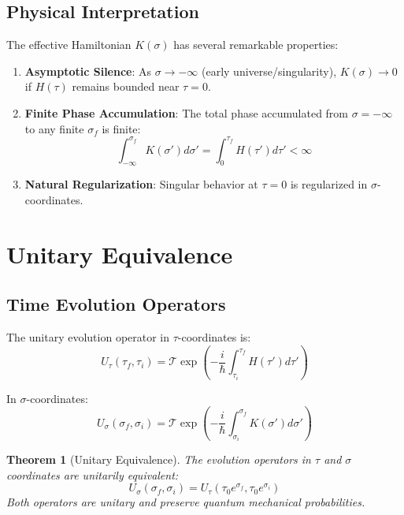 \documentclass[11pt,a4paper]{article}
\newtheorem{theorem}{Theorem}[section]
\begin{document}
\subsection{Physical Interpretation}

The effective Hamiltonian $K(\sigma)$ has several remarkable properties:

\begin{enumerate}
\item \textbf{Asymptotic Silence}: As $\sigma \to -\infty$ (early universe/singularity), $K(\sigma) \to 0$ if $H(\tau)$ remains bounded near $\tau = 0$.

\item \textbf{Finite Phase Accumulation}: The total phase accumulated from $\sigma = -\infty$ to any finite $\sigma_f$ is finite:
\begin{equation}
\int_{-\infty}^{\sigma_f} K(\sigma') d\sigma' = \int_0^{\tau_f} H(\tau') d\tau' < \infty
\end{equation}

\item \textbf{Natural Regularization}: Singular behavior at $\tau = 0$ is regularized in $\sigma$-coordinates.
\end{enumerate}

\section{Unitary Equivalence}

\subsection{Time Evolution Operators}

The unitary evolution operator in $\tau$-coordinates is:
\begin{equation}
U_{\tau}(\tau_f, \tau_i) = \mathcal{T} \exp\left(-\frac{i}{\hbar} \int_{\tau_i}^{\tau_f} H(\tau') d\tau'\right)
\end{equation}

In $\sigma$-coordinates:
\begin{equation}
U_{\sigma}(\sigma_f, \sigma_i) = \mathcal{T} \exp\left(-\frac{i}{\hbar} \int_{\sigma_i}^{\sigma_f} K(\sigma') d\sigma'\right)
\end{equation}

\begin{theorem}[Unitary Equivalence]
The evolution operators in $\tau$ and $\sigma$ coordinates are unitarily equivalent:
\begin{equation}
U_{\sigma}(\sigma_f, \sigma_i) = U_{\tau}(\tau_0 e^{\sigma_f}, \tau_0 e^{\sigma_i})
\end{equation}
Both operators are unitary and preserve quantum mechanical probabilities.
\end{theorem}
\end{document}
